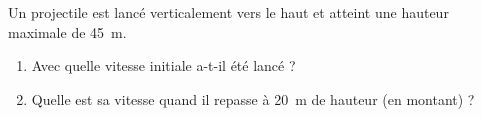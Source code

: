 \documentclass[11pt,a4paper]{article}
\begin{document}
\begin{exo}
Un projectile est lancé verticalement vers le haut et atteint une hauteur maximale de \qty{45}{\metre}.
\begin{enumerate}[label=\alph*)]
  \item Avec quelle vitesse initiale a-t-il été lancé ?
  \item Quelle est sa vitesse quand il repasse à \qty{20}{\metre} de hauteur (en montant) ?
\end{enumerate}
\end{exo}
\end{document}
